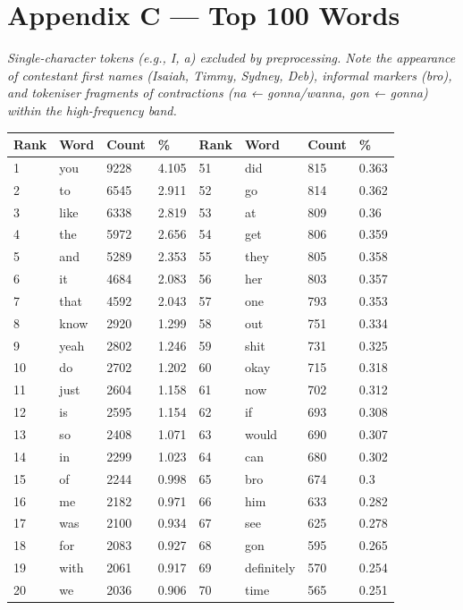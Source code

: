 \documentclass[11pt]{article}
\begin{document}
\section*{Appendix C --- Top 100 Words}

\emph{Single-character tokens (e.g., I, a) excluded by preprocessing. Note the appearance of contestant first names (Isaiah, Timmy, Sydney, Deb), informal markers (bro), and tokeniser fragments of contractions (na ← gonna/wanna, gon ← gonna) within the high-frequency band.}

\begin{center}
\footnotesize\setlength{\tabcolsep}{4pt}
\begin{tabular}{llllllll}
\toprule
Rank & Word & Count & \% & Rank & Word & Count & \% \\
\midrule
1 & you & 9228 & 4.105 & 51 & did & 815 & 0.363 \\
2 & to & 6545 & 2.911 & 52 & go & 814 & 0.362 \\
3 & like & 6338 & 2.819 & 53 & at & 809 & 0.36 \\
4 & the & 5972 & 2.656 & 54 & get & 806 & 0.359 \\
5 & and & 5289 & 2.353 & 55 & they & 805 & 0.358 \\
6 & it & 4684 & 2.083 & 56 & her & 803 & 0.357 \\
7 & that & 4592 & 2.043 & 57 & one & 793 & 0.353 \\
8 & know & 2920 & 1.299 & 58 & out & 751 & 0.334 \\
9 & yeah & 2802 & 1.246 & 59 & shit & 731 & 0.325 \\
10 & do & 2702 & 1.202 & 60 & okay & 715 & 0.318 \\
11 & just & 2604 & 1.158 & 61 & now & 702 & 0.312 \\
12 & is & 2595 & 1.154 & 62 & if & 693 & 0.308 \\
13 & so & 2408 & 1.071 & 63 & would & 690 & 0.307 \\
14 & in & 2299 & 1.023 & 64 & can & 680 & 0.302 \\
15 & of & 2244 & 0.998 & 65 & bro & 674 & 0.3 \\
16 & me & 2182 & 0.971 & 66 & him & 633 & 0.282 \\
17 & was & 2100 & 0.934 & 67 & see & 625 & 0.278 \\
18 & for & 2083 & 0.927 & 68 & gon & 595 & 0.265 \\
19 & with & 2061 & 0.917 & 69 & definitely & 570 & 0.254 \\
20 & we & 2036 & 0.906 & 70 & time & 565 & 0.251 \\

\end{tabular}
\end{center}
\end{document}
